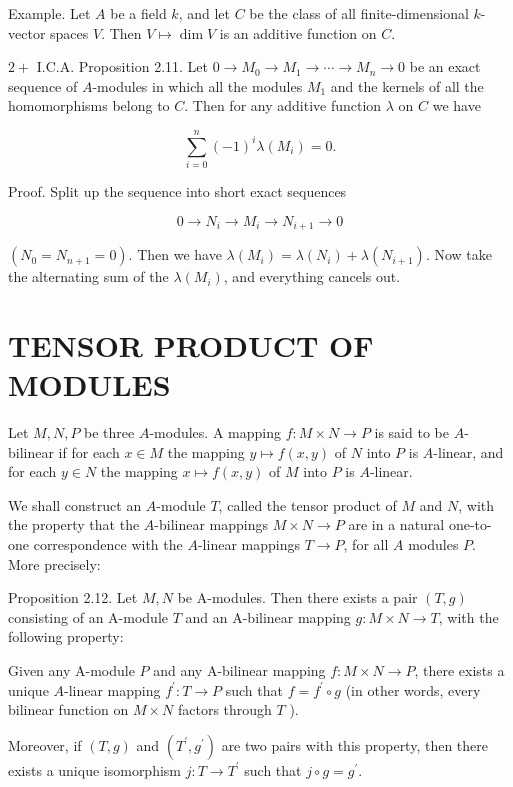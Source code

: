 \documentclass{standalone}
\theoremstyle{definition}
\theoremstyle{remark}
\begin{document}
Example. Let $A$ be a field $k$, and let $C$ be the class of all finite-dimensional $k$-vector spaces $V$. Then $V \mapsto \operatorname{dim} V$ is an additive function on $C$.

$2+$ I.C.A. Proposition 2.11. Let $0 \rightarrow M_{0} \rightarrow M_{1} \rightarrow \cdots \rightarrow M_{n} \rightarrow 0$ be an exact sequence of $A$-modules in which all the modules $M_{1}$ and the kernels of all the homomorphisms belong to $C$. Then for any additive function $\lambda$ on $C$ we have

\[
\sum_{i=0}^{n}(-1)^{i} \lambda\left(M_{i}\right)=0 .
\]

Proof. Split up the sequence into short exact sequences

\[
0 \rightarrow N_{i} \rightarrow M_{i} \rightarrow N_{i+1} \rightarrow 0
\]

$\left(N_{0}=N_{n+1}=0\right)$. Then we have $\lambda\left(M_{i}\right)=\lambda\left(N_{i}\right)+\lambda\left(N_{i+1}\right)$. Now take the alternating sum of the $\lambda\left(M_{i}\right)$, and everything cancels out.

\section{TENSOR PRODUCT OF MODULES}
Let $M, N, P$ be three $A$-modules. A mapping $f: M \times N \rightarrow P$ is said to be $A$-bilinear if for each $x \in M$ the mapping $y \mapsto f(x, y)$ of $N$ into $P$ is $A$-linear, and for each $y \in N$ the mapping $x \mapsto f(x, y)$ of $M$ into $P$ is $A$-linear.

We shall construct an $A$-module $T$, called the tensor product of $M$ and $N$, with the property that the $A$-bilinear mappings $M \times N \rightarrow P$ are in a natural one-to-one correspondence with the $A$-linear mappings $T \rightarrow P$, for all $A$ modules $P$. More precisely:

Proposition 2.12. Let $M, N$ be A-modules. Then there exists a pair $(T, g)$ consisting of an A-module $T$ and an A-bilinear mapping $g: M \times N \rightarrow T$, with the following property:

Given any A-module $P$ and any A-bilinear mapping $f: M \times N \rightarrow P$, there exists a unique $A$-linear mapping $f^{\prime}: T \rightarrow P$ such that $f=f^{\prime} \circ g$ (in other words, every bilinear function on $M \times N$ factors through $T$ ).

Moreover, if $(T, g)$ and $\left(T^{\prime}, g^{\prime}\right)$ are two pairs with this property, then there exists a unique isomorphism $j: T \rightarrow T^{\prime}$ such that $j \circ g=g^{\prime}$.
\end{document}
